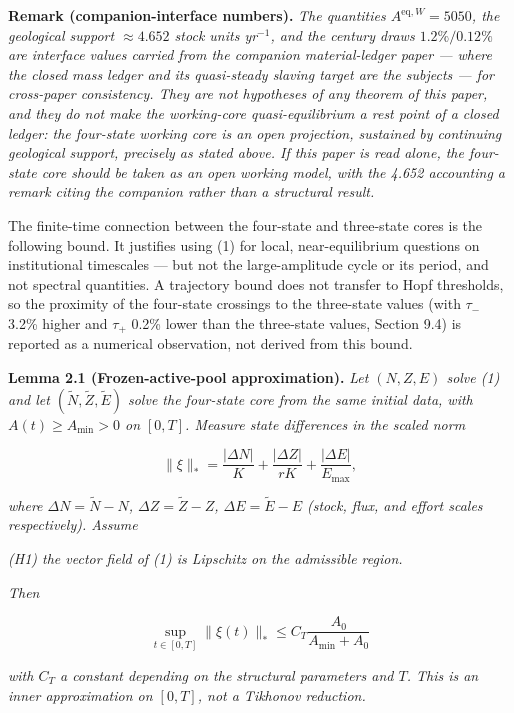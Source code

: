 \documentclass[11pt]{article}
\begin{document}
\textbf{Remark (companion-interface numbers).} \emph{The quantities
\(A^{\mathrm{eq},W} = 5050\), the geological support \(\approx 4.652\)
stock units yr\(^{-1}\), and the century draws \(1.2\%/0.12\%\) are
interface values carried from the companion material-ledger paper ---
where the closed mass ledger and its quasi-steady slaving target are the
subjects --- for cross-paper consistency. They are not hypotheses of any
theorem of this paper, and they do not make the working-core
quasi-equilibrium a rest point of a closed ledger: the four-state
working core is an open projection, sustained by continuing geological
support, precisely as stated above. If this paper is read alone, the
four-state core should be taken as an open working model, with the 4.652
accounting a remark citing the companion rather than a structural
result.}

The finite-time connection between the four-state and three-state cores
is the following bound. It justifies using (1) for local,
near-equilibrium questions on institutional timescales --- but not the
large-amplitude cycle or its period, and not spectral quantities. A
trajectory bound does not transfer to Hopf thresholds, so the proximity
of the four-state crossings to the three-state values (with \(\tau_-\)
3.2\% higher and \(\tau_+\) 0.2\% lower than the three-state values,
Section 9.4) is reported as a numerical observation, not derived from
this bound.

\textbf{Lemma 2.1 (Frozen-active-pool approximation).} \emph{Let
\((N, Z, E)\) solve (1) and let \((\tilde N, \tilde Z, \tilde E)\) solve
the four-state core from the same initial data, with
\(A(t) \ge A_{\min} > 0\) on \([0,T]\). Measure state differences in the
scaled norm}

\[\|\xi\|_* = \frac{|\Delta N|}{K} + \frac{|\Delta Z|}{rK} + \frac{|\Delta E|}{E_{\max}},\]

\emph{where \(\Delta N = \tilde N - N\), \(\Delta Z = \tilde Z - Z\),
\(\Delta E = \tilde E - E\) (stock, flux, and effort scales
respectively). Assume}

\emph{(H1) the vector field of (1) is Lipschitz on the admissible
region.}

\emph{Then}

\[\sup_{t \in [0,T]} \|\xi(t)\|_* \le C_T \frac{A_0}{A_{\min} + A_0}\]

\emph{with \(C_T\) a constant depending on the structural parameters and
\(T\). This is an inner approximation on \([0,T]\), not a Tikhonov
reduction.}
\end{document}
